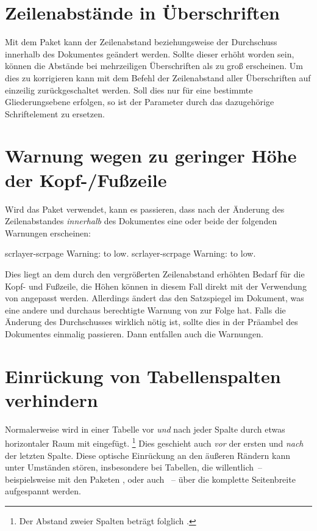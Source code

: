 \section{%
  Zeilenabstände in Überschriften%
  \label{sec:tips:headings}%
}
%
Mit dem Paket  kann der Zeilenabstand beziehungsweise der 
Durchschuss innerhalb des Dokumentes geändert werden. Sollte dieser erhöht 
worden sein, können die Abstände bei mehrzeiligen Überschriften als zu groß 
erscheinen. Um dies zu korrigieren kann mit dem Befehl 
der Zeilenabstand aller Überschriften auf einzeilig zurückgeschaltet werden. 
Soll dies nur für eine bestimmte Gliederungsebene erfolgen, so ist der 
Parameter  durch das dazugehörige Schriftelement zu 
ersetzen.



\section{%
  Warnung wegen zu geringer Höhe der Kopf-/Fußzeile%
  \label{sec:tips:headline}%
}
%
Wird das Paket  verwendet, kann es passieren, dass nach der 
Änderung des Zeilenabstandes \emph{innerhalb} des Dokumentes eine oder beide 
der folgenden Warnungen erscheinen:
%
\begin{quoting}
\begin{Code}
scrlayer-scrpage Warning: \headheight to low.
scrlayer-scrpage Warning: \footheight to low.
\end{Code}
\end{quoting}
%
Dies liegt an dem durch den vergrößerten Zeilenabstand erhöhten Bedarf für die
Kopf- und Fußzeile, die Höhen können in diesem Fall direkt mit der Verwendung 
von  angepasst werden. Allerdings ändert das den 
Satzspiegel im Dokument, was eine andere und durchaus berechtigte Warnung von 
 zur Folge hat. Falls die Änderung des Durchschusses wirklich 
nötig ist, sollte dies in der Präambel des Dokumentes einmalig passieren. Dann 
entfallen auch die Warnungen.



\section{%
  Einrückung von Tabellenspalten verhindern%
  \label{sec:tips:table}%
}
%
Normalerweise wird in einer Tabelle vor \emph{und} nach jeder Spalte durch 
 etwas horizontaler Raum mit  
eingefügt.%
\footnote{%
  Der Abstand zweier Spalten beträgt folglich .%
}
Dies geschieht auch \emph{vor} der ersten und \emph{nach} der letzten Spalte. 
Diese optische Einrückung an den äußeren Rändern kann unter Umständen stören, 
insbesondere bei Tabellen, die willentlich~-- beispielsweise mit den Paketen 
,  oder auch ~-- über die 
komplette Seitenbreite aufgespannt werden.

